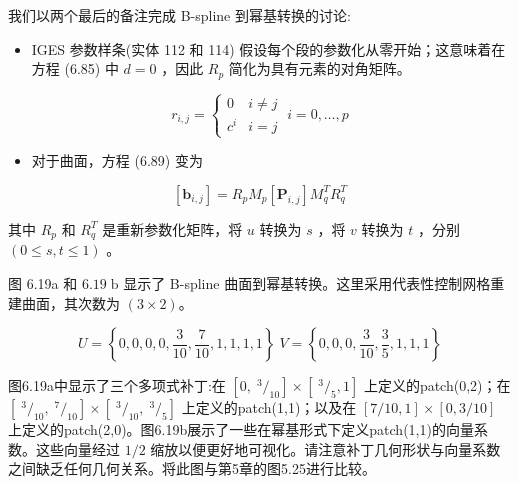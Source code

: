 \documentclass[../main.tex]{subfiles}
\begin{document}
我们以两个最后的备注完成 B-spline 到幂基转换的讨论:

\begin{itemize}
\item IGES 参数样条(实体 112 和 114)\cite{IGE93} 假设每个段的参数化从零开始；这意味着在方程 (6.85) 中 \(d = 0\) ，因此 \({R}_{p}\) 简化为具有元素的对角矩阵。
\end{itemize}

\[
{r}_{i,j} = \left\{  {\begin{array}{ll} 0 & i \neq  j \\  {c}^{i} & i = j \end{array}\;i = 0,\ldots ,p}\right.  \tag{6.90}
\]



\begin{itemize}
\item 对于曲面，方程 (6.89) 变为
\end{itemize}

\[
\left\lbrack  {\mathbf{b}}_{i,j}\right\rbrack   = {R}_{p}{M}_{p}\left\lbrack  {\mathbf{P}}_{i,j}\right\rbrack  {M}_{q}^{T}{R}_{q}^{T} \tag{6.91}
\]

其中 \({R}_{p}\) 和 \({R}_{q}^{T}\) 是重新参数化矩阵，将 \(u\) 转换为 \(s\) ，将 \(v\) 转换为 \(t\) ，分别 \(\left( {0 \leq  s,t \leq  1}\right)\) 。

图 6.19a 和 \({6.19}\mathrm{\;b}\) 显示了 B-spline 曲面到幂基转换。这里采用代表性控制网格重建曲面，其次数为 \(\left( {3 \times  2}\right)\)。

\[
U = \left\{  {0,0,0,0,\frac{3}{10},\frac{7}{10},1,1,1,1}\right\}  \;V = \left\{  {0,0,0,\frac{3}{10},\frac{3}{5},1,1,1}\right\}
\]

图6.19a中显示了三个多项式补丁:在 \(\left\lbrack  {0,{\;}^{3}{/}_{10}}\right\rbrack   \times  \left\lbrack  {{\;}^{3}{/}_{5},1}\right\rbrack\) 上定义的patch(0,2)；在 \(\left\lbrack  {{\;}^{3}{/}_{10},{\;}^{7}{/}_{10}}\right\rbrack   \times  \left\lbrack  {{\;}^{3}{/}_{10},{\;}^{3}{/}_{5}}\right\rbrack\) 上定义的patch(1,1)；以及在 \(\left\lbrack  {7/{10},1}\right\rbrack   \times  \left\lbrack  {0,3/{10}}\right\rbrack\) 上定义的patch(2,0)。图6.19b展示了一些在幂基形式下定义patch(1,1)的向量系数。这些向量经过 \(1/2\) 缩放以便更好地可视化。请注意补丁几何形状与向量系数之间缺乏任何几何关系。将此图与第5章的图5.25进行比较。
\end{document}
